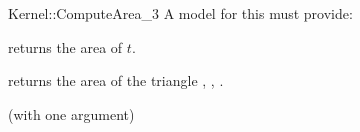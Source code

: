 \begin{ccRefFunctionObjectConcept}{Kernel::ComputeArea_3}
A model for this must provide:


       {returns the area of $t$. }

{returns the area of the triangle , , . }

\ccRefines
{} (with one argument)

\ccSeeAlso
{}\\

\end{ccRefFunctionObjectConcept}
